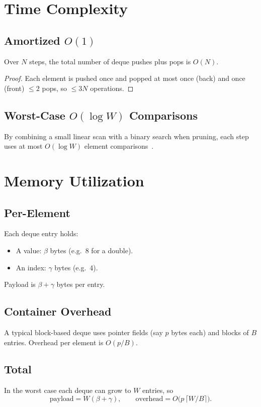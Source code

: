 \documentclass[12pt,letterpaper]{article}
\begin{document}
\section{Time Complexity}
\subsection{Amortized \(O(1)\)}
\begin{theorem}
Over \(N\) steps, the total number of deque pushes plus pops is \(O(N)\).
\end{theorem}
\begin{proof}
Each element is pushed once and popped at most once (back) and once (front) \(\le2\) pops, so \(\le3N\) operations.
\end{proof}

\subsection{Worst-Case \(O(\log W)\) Comparisons}
By combining a small linear scan with a binary search when pruning, each step uses at most \(O(\log W)\) element comparisons~\cite{Lemire2006}.

\section{Memory Utilization}
\subsection{Per-Element}
Each deque entry holds:
\begin{itemize}
  \item A value: \(\beta\) bytes (e.g.\ 8 for a double).
  \item An index: \(\gamma\) bytes (e.g.\ 4).
\end{itemize}
Payload is \(\beta+\gamma\) bytes per entry.

\subsection{Container Overhead}
A typical block-based deque uses pointer fields (say \(p\) bytes each) and blocks of \(B\) entries.  Overhead per element is \(O(p/B)\).

\subsection{Total}
In the worst case each deque can grow to \(W\) entries, so
\[
  \text{payload} = W(\beta+\gamma),\qquad
  \text{overhead} = O\bigl(p\,\lceil W/B\rceil\bigr).
\]
\end{document}
